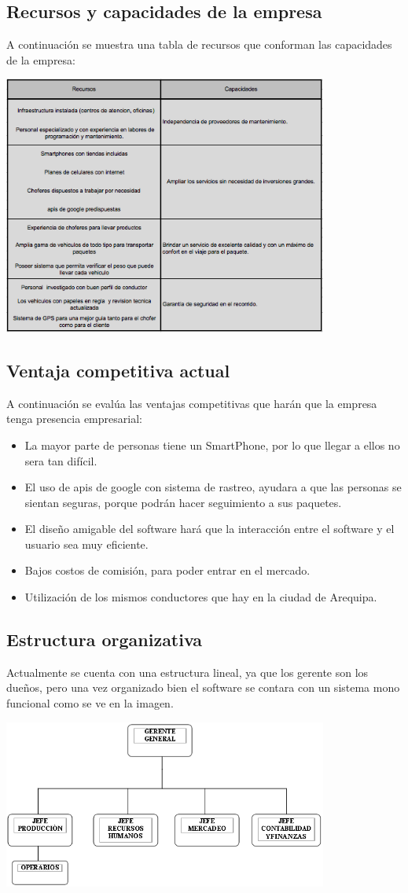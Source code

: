 \subsection{Recursos y capacidades de la empresa}
A continuación se muestra una tabla de recursos que conforman las capacidades de la empresa:

\includegraphics[width=0.8\textwidth]{tablaRyC}

\subsection{Ventaja competitiva actual}
A continuación se evalúa las ventajas competitivas que harán que la empresa tenga presencia empresarial:
\begin{itemize}
    \item La mayor parte de personas tiene un SmartPhone, por lo que llegar a ellos no sera tan difícil.
    \item El uso de apis de google con sistema de rastreo, ayudara a que las personas se sientan seguras, porque podrán hacer seguimiento a sus paquetes.
    \item El diseño amigable del software hará que la interacción entre el software y el usuario sea muy eficiente.
    \item Bajos costos de comisión, para poder entrar en el mercado.
    \item Utilización de los mismos conductores que hay en la ciudad de Arequipa.
\end{itemize}

\subsection{Estructura organizativa}
Actualmente se cuenta con una estructura lineal, ya que los gerente son los dueños, pero una vez organizado bien el software se contara con un sistema mono funcional como se ve en la imagen.

\includegraphics[width=0.8\textwidth]{planNegocios}
